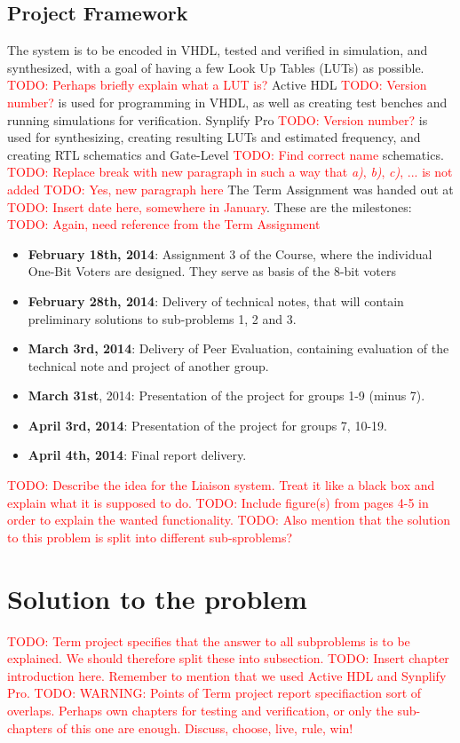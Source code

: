 \documentclass[a4paper]{IEEEtran}
\newcommand\TODO[1]{\textcolor{red}{TODO:#1}}
\newcommand\todo[1]{\TODO{#1}}
\begin{document}
\subsection{Project Framework}
The system is to be encoded in VHDL, tested and verified in simulation, and synthesized, with a goal of having a few Look Up Tables (LUTs) as possible. \todo{ Perhaps briefly explain what a LUT is?}
Active HDL \todo{ Version number?} is used for programming in VHDL, as well as creating test benches and running simulations for verification. Synplify Pro \todo{ Version number?} is used for synthesizing, creating resulting LUTs and estimated frequency, and creating RTL schematics and Gate-Level \todo{ Find correct name} schematics. 
\break 
\todo{ Replace break with new paragraph in such a way that \textit{a)}, \textit{b)}, \textit{c)}, ... is not added}
\break
\todo{ Yes, new paragraph here} The Term Assignment was handed out at \todo{ Insert date here, somewhere in January}. These are the milestones: \todo{ Again, need reference from the Term Assignment}
\begin{itemize}
    \item \textbf{February 18th, 2014}: Assignment 3 of the Course, where the individual One-Bit Voters are designed. They serve as basis of the 8-bit voters
    \item \textbf{February 28th, 2014}: Delivery of technical notes, that will contain preliminary solutions to sub-problems 1, 2 and 3.
    \item \textbf{March 3rd, 2014}: Delivery of Peer Evaluation, containing evaluation of the technical note and project of another group.
    \item \textbf{March 31st}, 2014: Presentation of the project for groups 1-9 (minus 7).
    \item \textbf{April 3rd, 2014}: Presentation of the project for groups 7, 10-19.
    \item \textbf{April 4th, 2014}: Final report delivery.
\end{itemize}

\break
\break
\todo{ Describe the idea for the Liaison system. Treat it like a black box and explain what it is supposed to do.}
\break
\break
\todo{ Include figure(s) from pages 4-5 in order to explain the wanted functionality. }
\break
\break
\todo{ Also mention that the solution to this problem is split into different sub-sproblems? }

\section{ Solution to the problem}
\todo{ Term project specifies that the answer to all subproblems is to be explained. We should therefore split these into subsection. }
\break
\break
\todo{ Insert chapter introduction here. Remember to mention that we used Active HDL and Synplify Pro.}
\break
\break
\todo{ WARNING: Points of Term project report specifiaction sort of overlaps. Perhaps own chapters for testing and verification, or only the sub-chapters of this one are enough. Discuss, choose, live, rule, win!} 
\end{document}
